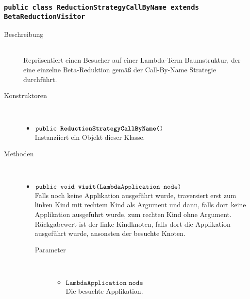\subsubsection{\normalfont \texttt{public class \textbf{ReductionStrategyCallByName} extends BetaReductionVisitor}}

\begin{description}
\item[Beschreibung] \hfill \\ Repräsentiert einen Besucher auf einer Lambda-Term Baumstruktur, der eine einzelne Beta-Reduktion gemäß der Call-By-Name Strategie durchführt.

\item[Konstruktoren] \hfill \\
	\vspace{-.8cm}
	\begin{itemize}
		\item $\texttt{public \textbf{ReductionStrategyCallByName}()}$ \\ Instanziiert ein Objekt dieser Klasse.
	\end{itemize}

\item[Methoden] \hfill \\
	\vspace{-.8cm}
	\begin{itemize}
		\item $\texttt{public void \textbf{visit}(LambdaApplication node)}$ \\ Falls noch keine Applikation ausgeführt wurde, traversiert erst zum linken Kind mit rechtem Kind als Argument und dann, falls dort keine Applikation ausgeführt wurde, zum rechten Kind ohne Argument. Rückgabewert ist der linke Kindknoten, falls dort die Applikation ausgeführt wurde, ansonsten der besuchte Knoten.
		\begin{description}
			\item[Parameter] \hfill \\
			\vspace{-.8cm}
			\begin{itemize}
				\item $\texttt{LambdaApplication node}$ \\ Die besuchte Applikation.
			\end{itemize}
		\end{description}
		

\end{itemize}
\end{description}
